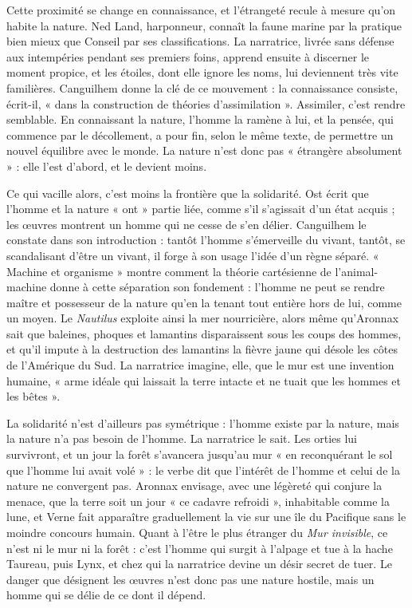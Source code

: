 \documentclass[11pt,a4paper]{article}
\begin{document}
Cette proximité se change en connaissance, et l'étrangeté recule à mesure qu'on habite la nature. Ned Land, harponneur, connaît la faune marine par la pratique bien mieux que Conseil par ses classifications. La narratrice, livrée sans défense aux intempéries pendant ses premiers foins, apprend ensuite à discerner le moment propice, et les étoiles, dont elle ignore les noms, lui deviennent très vite familières. Canguilhem donne la clé de ce mouvement : la connaissance consiste, écrit-il, « dans la construction de théories d'assimilation ». Assimiler, c'est rendre semblable. En connaissant la nature, l'homme la ramène à lui, et la pensée, qui commence par le décollement, a pour fin, selon le même texte, de permettre un nouvel équilibre avec le monde. La nature n'est donc pas « étrangère absolument » : elle l'est d'abord, et le devient moins.

Ce qui vacille alors, c'est moins la frontière que la solidarité. Ost écrit que l'homme et la nature « ont » partie liée, comme s'il s'agissait d'un état acquis ; les œuvres montrent un homme qui ne cesse de s'en délier. Canguilhem le constate dans son introduction : tantôt l'homme s'émerveille du vivant, tantôt, se scandalisant d'être un vivant, il forge à son usage l'idée d'un règne séparé. « Machine et organisme » montre comment la théorie cartésienne de l'animal-machine donne à cette séparation son fondement : l'homme ne peut se rendre maître et possesseur de la nature qu'en la tenant tout entière hors de lui, comme un moyen. Le \emph{Nautilus} exploite ainsi la mer nourricière, alors même qu'Aronnax sait que baleines, phoques et lamantins disparaissent sous les coups des hommes, et qu'il impute à la destruction des lamantins la fièvre jaune qui désole les côtes de l'Amérique du Sud. La narratrice imagine, elle, que le mur est une invention humaine, « arme idéale qui laissait la terre intacte et ne tuait que les hommes et les bêtes ».

La solidarité n'est d'ailleurs pas symétrique : l'homme existe par la nature, mais la nature n'a pas besoin de l'homme. La narratrice le sait. Les orties lui survivront, et un jour la forêt s'avancera jusqu'au mur « en reconquérant le sol que l'homme lui avait volé » : le verbe dit que l'intérêt de l'homme et celui de la nature ne convergent pas. Aronnax envisage, avec une légèreté qui conjure la menace, que la terre soit un jour « ce cadavre refroidi », inhabitable comme la lune, et Verne fait apparaître graduellement la vie sur une île du Pacifique sans le moindre concours humain. Quant à l'être le plus étranger du \emph{Mur invisible}, ce n'est ni le mur ni la forêt : c'est l'homme qui surgit à l'alpage et tue à la hache Taureau, puis Lynx, et chez qui la narratrice devine un désir secret de tuer. Le danger que désignent les œuvres n'est donc pas une nature hostile, mais un homme qui se délie de ce dont il dépend.
\end{document}
